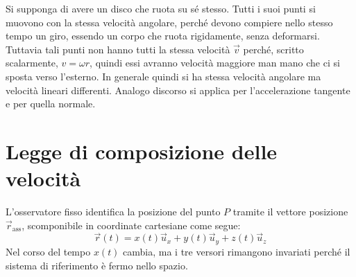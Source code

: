 \documentclass[10pt,a4paper]{book}
\begin{document}
Si supponga di avere un disco che ruota su sé stesso. Tutti i suoi punti si muovono con la stessa velocità angolare, perché devono compiere nello stesso tempo un giro, essendo un corpo che ruota rigidamente, senza deformarsi. Tuttavia tali punti non hanno tutti la stessa velocità $\vec{v}$ perché, scritto scalarmente, $v=\omega r$, quindi essi avranno velocità maggiore man mano che ci si sposta verso l'esterno. In generale quindi si ha stessa velocità angolare ma velocità lineari differenti. Analogo discorso si applica per l'accelerazione tangente e per quella normale.







































\section{Legge di composizione delle velocità}

L'osservatore fisso identifica la posizione del punto $P$ tramite il vettore posizione $\vec{r}_{\text{ass}}$, scomponibile in coordinate cartesiane come segue:
\[
	\vec{r}(t)=x(t) \vec{u}_x+y(t)\vec{u}_y+z(t)\vec{u}_z
\]
Nel corso del tempo $x(t)$ cambia, ma i tre versori rimangono invariati perché il sistema di riferimento è fermo nello spazio.
\end{document}
